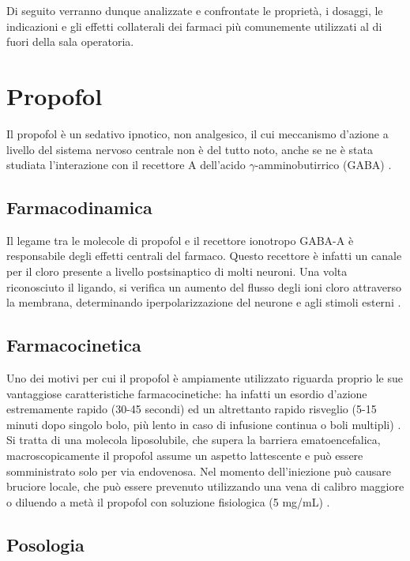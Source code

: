 Di seguito verranno dunque analizzate e confrontate le proprietà, i dosaggi, le indicazioni e gli effetti collaterali dei farmaci più comunemente utilizzati al di fuori della sala operatoria. 

\section{Propofol}

Il propofol è un sedativo ipnotico, non analgesico, il cui meccanismo d'azione a livello del sistema nervoso centrale non è del tutto noto, anche se ne è stata studiata l'interazione con il recettore A dell'acido $\gamma$-amminobutirrico (GABA) \cite{Propofol2015}.

\subsection*{Farmacodinamica}

Il legame tra le molecole di propofol e il recettore ionotropo GABA-A è responsabile degli effetti centrali del farmaco. Questo recettore è infatti un canale per il cloro presente a livello postsinaptico di molti neuroni. Una volta riconosciuto il ligando, si verifica un aumento del flusso degli ioni cloro attraverso la membrana, determinando iperpolarizzazione del neurone e {\color{orange}{refrattarietà}} agli stimoli esterni \cite{Propofol2015}.

\subsection*{Farmacocinetica}

Uno dei motivi per cui il propofol è ampiamente utilizzato riguarda proprio le sue vantaggiose caratteristiche farmacocinetiche: ha infatti un esordio d'azione estremamente rapido (30-45 secondi) ed un altrettanto rapido risveglio (5-15 minuti dopo singolo bolo, più lento in caso di infusione continua o boli multipli) \cite{Simeupsedazione, Uptodatepharmacology}. Si tratta di una molecola liposolubile, che supera la barriera ematoencefalica, macroscopicamente il propofol assume un aspetto lattescente e può essere somministrato solo per via endovenosa. Nel momento dell'iniezione può causare bruciore locale, che può essere prevenuto utilizzando una vena di calibro maggiore o diluendo a metà il propofol con soluzione fisiologica (5 mg/mL) \cite{Simeupsedazione}. 

\subsection*{Posologia}

